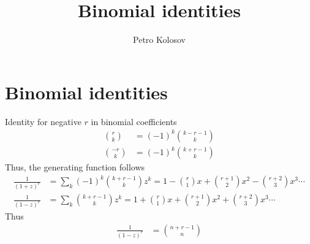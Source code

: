 ﻿\documentclass[12pt,letterpaper,oneside,reqno]{amsart}
\title[Binomial identities]
{Binomial identities}
\author[Petro Kolosov]{Petro Kolosov}
\numberwithin{equation}{section}
\begin{document}
    \maketitle

    \section{Binomial identities}\label{sec:binomial-identities}
    Identity for negative $r$ in binomial coefficients
    \begin{align*}
        \binom{r}{k}  &= (-1)^k \binom{k-r-1}{k} \\
        \binom{-r}{k} &= (-1)^k \binom{k+r-1}{k}
    \end{align*}
    Thus, the generating function follows
    \begin{align*}
        \frac{1}{(1+z)^r} &= \sum_{k} (-1)^k \binom{k+r-1}{k} z^k = 1 - \binom{r}{1}x + \binom{r+1}{2} x^2 - \binom{r+2}{3} x^3 \cdots \\
        \frac{1}{(1-z)^r} &= \sum_{k} \binom{k+r-1}{k} z^k = 1 + \binom{r}{1}x + \binom{r+1}{2} x^2 + \binom{r+2}{3} x^3 \cdots
    \end{align*}
    Thus
    \begin{align*}
        [z^n] \frac{1}{(1-z)^r} &= \binom{n+r-1}{n}
    \end{align*}
\end{document}
